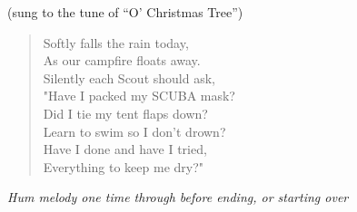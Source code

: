 
(sung to the tune of “O’ Christmas Tree”)\\

\begin{verse}
Softly falls the rain today,\\
As our campfire floats away.\\
Silently each Scout should ask,\\
"Have I packed my SCUBA mask?\\
Did I tie my tent flaps down?\\
Learn to swim so I don't drown?\\
Have I done and have I tried,\\
Everything to keep me dry?"

\end{verse}

\begin{center}
\textit{Hum melody one time through before ending, or starting over} \\
\end{center}
